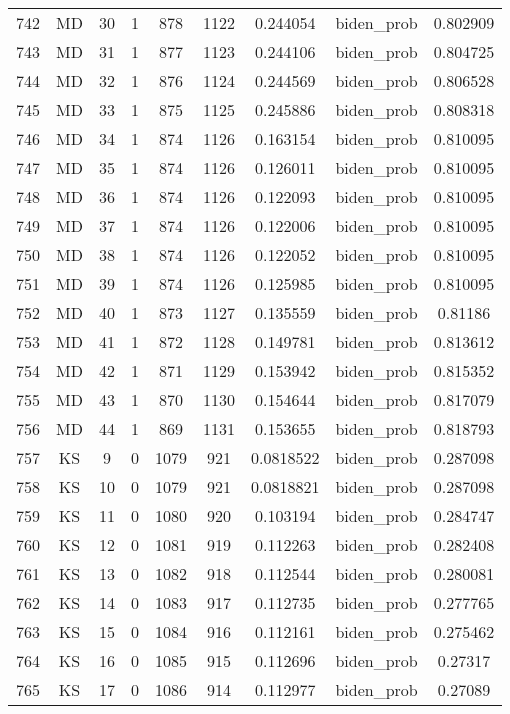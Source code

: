 \documentclass[12pt,a4paper]{article}
\begin{document}
\begin{tabular}{r|cccccccc}
	742 & MD & 30 & 1 & 878 & 1122 & 0.244054 & biden\_prob & 0.802909 \\
	743 & MD & 31 & 1 & 877 & 1123 & 0.244106 & biden\_prob & 0.804725 \\
	744 & MD & 32 & 1 & 876 & 1124 & 0.244569 & biden\_prob & 0.806528 \\
	745 & MD & 33 & 1 & 875 & 1125 & 0.245886 & biden\_prob & 0.808318 \\
	746 & MD & 34 & 1 & 874 & 1126 & 0.163154 & biden\_prob & 0.810095 \\
	747 & MD & 35 & 1 & 874 & 1126 & 0.126011 & biden\_prob & 0.810095 \\
	748 & MD & 36 & 1 & 874 & 1126 & 0.122093 & biden\_prob & 0.810095 \\
	749 & MD & 37 & 1 & 874 & 1126 & 0.122006 & biden\_prob & 0.810095 \\
	750 & MD & 38 & 1 & 874 & 1126 & 0.122052 & biden\_prob & 0.810095 \\
	751 & MD & 39 & 1 & 874 & 1126 & 0.125985 & biden\_prob & 0.810095 \\
	752 & MD & 40 & 1 & 873 & 1127 & 0.135559 & biden\_prob & 0.81186 \\
	753 & MD & 41 & 1 & 872 & 1128 & 0.149781 & biden\_prob & 0.813612 \\
	754 & MD & 42 & 1 & 871 & 1129 & 0.153942 & biden\_prob & 0.815352 \\
	755 & MD & 43 & 1 & 870 & 1130 & 0.154644 & biden\_prob & 0.817079 \\
	756 & MD & 44 & 1 & 869 & 1131 & 0.153655 & biden\_prob & 0.818793 \\
	757 & KS & 9 & 0 & 1079 & 921 & 0.0818522 & biden\_prob & 0.287098 \\
	758 & KS & 10 & 0 & 1079 & 921 & 0.0818821 & biden\_prob & 0.287098 \\
	759 & KS & 11 & 0 & 1080 & 920 & 0.103194 & biden\_prob & 0.284747 \\
	760 & KS & 12 & 0 & 1081 & 919 & 0.112263 & biden\_prob & 0.282408 \\
	761 & KS & 13 & 0 & 1082 & 918 & 0.112544 & biden\_prob & 0.280081 \\
	762 & KS & 14 & 0 & 1083 & 917 & 0.112735 & biden\_prob & 0.277765 \\
	763 & KS & 15 & 0 & 1084 & 916 & 0.112161 & biden\_prob & 0.275462 \\
	764 & KS & 16 & 0 & 1085 & 915 & 0.112696 & biden\_prob & 0.27317 \\
	765 & KS & 17 & 0 & 1086 & 914 & 0.112977 & biden\_prob & 0.27089 \\

\end{tabular}
\end{document}
